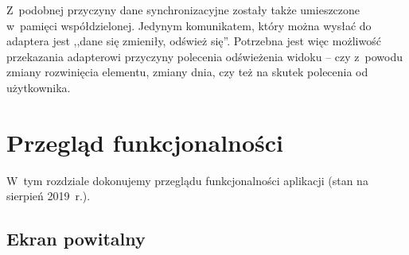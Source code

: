\documentclass{pracamgr}
\begin{document}
Z~podobnej przyczyny dane synchronizacyjne zostały także umieszczone w~pamięci współdzielonej.
Jedynym komunikatem, który można wysłać do adaptera jest ,,dane się zmieniły, odśwież się''.
Potrzebna jest więc możliwość przekazania adapterowi przyczyny polecenia odświeżenia widoku --
czy z~powodu zmiany rozwinięcia elementu, zmiany dnia, czy też na skutek polecenia od użytkownika.

\chapter{Przegląd funkcjonalności}
\label{sec:przeglad}

W~tym rozdziale dokonujemy przeglądu funkcjonalności aplikacji (stan na sierpień 2019~r.).

\section{Ekran powitalny}
\end{document}
